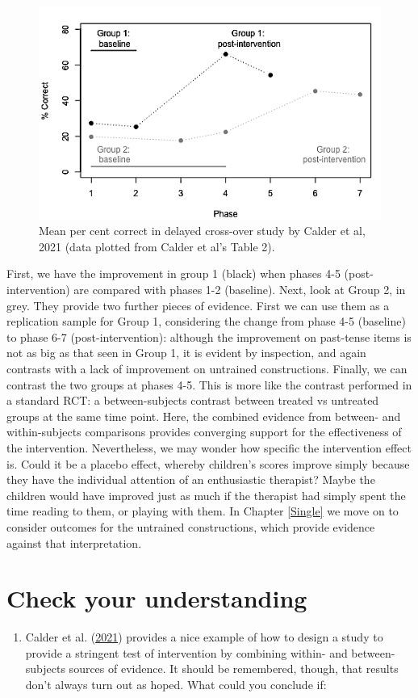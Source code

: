 \documentclass{krantz}
\providecommand{\tightlist}{%
\setlength{\itemsep}{0pt}\setlength{\parskip}{0pt}}
\begin{document}
\begin{figure}
\includegraphics[width=0.6\linewidth]{images_bw/calderfig-1} \caption{Mean per cent correct in delayed cross-over study by Calder et al, 2021 (data plotted from Calder et al's Table 2).}\label{fig:calderfig}
\end{figure}

First, we have the improvement in group 1 (black) when phases 4-5 (post-intervention) are compared with phases 1-2 (baseline). Next, look at Group 2, in grey. They provide two further pieces of evidence. First we can use them as a replication sample for Group 1, considering the change from phase 4-5 (baseline) to phase 6-7 (post-intervention): although the improvement on past-tense items is not as big as that seen in Group 1, it is evident by inspection, and again contrasts with a lack of improvement on untrained constructions. Finally, we can contrast the two groups at phases 4-5. This is more like the contrast performed in a standard RCT: a between-subjects contrast between treated vs untreated groups at the same time point. Here, the combined evidence from between- and within-subjects comparisons provides converging support for the effectiveness of the intervention. Nevertheless, we may wonder how specific the intervention effect is. Could it be a placebo effect, whereby children's scores improve simply because they have the individual attention of an enthusiastic therapist? Maybe the children would have improved just as much if the therapist had simply spent the time reading to them, or playing with them. In Chapter \ref{Single} we move on to consider outcomes for the untrained constructions, which provide evidence against that interpretation.

\hypertarget{check-your-understanding-18}{%
\section{Check your understanding}\label{check-your-understanding-18}}

\begin{enumerate}
\def\labelenumi{\arabic{enumi}.}
\tightlist
\item
  Calder et al. (\protect\hyperlink{ref-calder2021}{2021}) provides a nice example of how to design a study to provide a stringent test of intervention by combining within- and between-subjects sources of evidence. It should be remembered, though, that results don't always turn out as hoped. What could you conclude if:
\end{enumerate}
\end{document}
